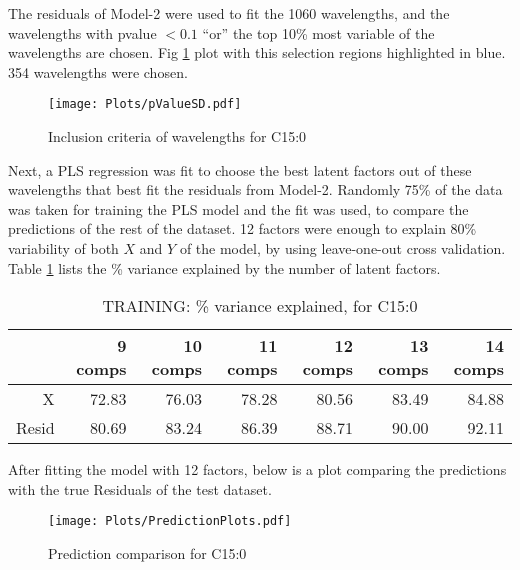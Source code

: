The residuals of Model-2 were used to fit the 1060 wavelengths, and the wavelengths with pvalue $< 0.1$ ``or'' the top 10\% most variable of the wavelengths are chosen. Fig \ref{fig:pvalSD15} plot with this selection regions highlighted in blue. 354 wavelengths were chosen. 
\begin{figure}[H]
\begin{center}
\texttt{[image: Plots/pValueSD.pdf]}
\end{center}
\caption{Inclusion criteria of wavelengths for C15:0}
\label{fig:pvalSD15}
\end{figure}
Next, a PLS regression was fit to choose the best latent factors out of these wavelengths that best fit the residuals from Model-2. Randomly 75\% of the data was taken for training the PLS model and the fit was used, to compare the predictions of the rest of the dataset. 12 factors were enough to explain 80\% variability of both $X$ and $Y$ of the model, by using leave-one-out cross validation. Table \ref{Tab:plsr15} lists the \% variance explained by the number of latent factors.
\begin{table}[H]
\centering
\begin{tabular}{rrrrrrr}
  \hline
      & 9 comps & 10 comps & 11 comps & 12 comps & 13 comps & 14 comps \\
  \hline
  X   & 72.83   &  76.03   &  78.28   & 80.56    & 83.49    & 84.88 \\
Resid & 80.69   &  83.24   &  86.39   & 88.71    & 90.00    & 92.11 \\
  \hline
\end{tabular}
\caption{TRAINING: \% variance explained, for C15:0}
\label{Tab:plsr15}
\end{table}

After fitting the model with 12 factors, below is a plot comparing the predictions with the true Residuals of the test dataset.
\begin{figure}[H]
\begin{center}
\texttt{[image: Plots/PredictionPlots.pdf]}
\end{center}
\caption{Prediction comparison for C15:0}
\label{fig:plsr15}
\end{figure}

